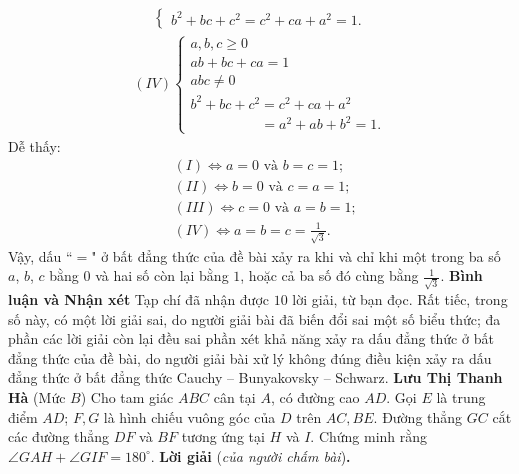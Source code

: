 \begin{multicols}{2}
\begin{align*}
\begin{cases}
			{b^2} + bc + {c^2} = {c^2} + ca + {a^2} = 1.
		\end{cases}
	\end{align*}
	\begin{align*}
		(IV)\begin{cases}
				a,b,c \ge 0\\[-0.5ex]
				ab + bc + ca = 1\\[-0.5ex]
				abc \ne 0\\[-0.5ex]
				{b^2} + bc + {c^2} = {c^2} + ca + {a^2} \\[-0.5ex]
				\quad\quad\quad\quad\quad= {a^2} + ab + {b^2} = 1.
		\end{cases}
	\end{align*}
	Dễ thấy:
	\begin{align*}
		&(I) \Leftrightarrow a = 0 \text{ và } b = c = 1;\\[-0.5ex]
		&(II) \Leftrightarrow b = 0 \text{ và } c = a = 1;\\[-0.5ex]
		&(III) \Leftrightarrow c = 0 \text{ và } a = b = 1;\\[-0.5ex]
		&(IV) \Leftrightarrow a=b=c= \frac{1}{\sqrt{3}}.
	\end{align*}
	Vậy, dấu ``$=$" ở bất đẳng thức của đề bài xảy ra khi và chỉ khi một trong ba số $a$, $b$, $c$ bằng $0$ và hai số còn lại bằng $1$, hoặc cả ba số đó cùng bằng  $\frac{1}{\sqrt{3}}$.
	\vskip 0.05cm
	\textbf{\color{thachthuctoanhoc}Bình luận và Nhận xét}
	\vskip 0.05cm
	Tạp chí đã nhận được $10$ lời giải, từ bạn đọc. Rất tiếc, trong số này, có một lời giải sai, do người giải bài đã biến đổi sai một số biểu thức; đa phần các lời giải còn lại đều sai phần xét khả năng xảy ra dấu đẳng thức ở bất đẳng thức của đề bài, do người giải bài xử lý không đúng điều kiện xảy ra dấu đẳng thức ở bất đẳng thức Cauchy -- Bunyakovsky -- Schwarz.
	\vskip 0.05cm
	\hfill	\textbf{\color{thachthuctoanhoc}Lưu Thị Thanh Hà}
	\vskip 0.01cm
	{}
	(Mức $B$) Cho tam giác $ABC$ cân tại $A$, có đường cao $AD$. Gọi $E$ là trung điểm $AD$; $F,G$ là hình chiếu vuông góc của $D$ trên $AC,BE$. Đường thẳng $GC$ cắt các đường thẳng $DF$ và $BF$ tương ứng tại $H$ và $I$. Chứng minh rằng $\angle{GAH}+\angle{GIF}=180^\circ$.  
	\vskip 0.05cm
	\textbf{\color{thachthuctoanhoc}Lời giải} (\textit{của người chấm bài})\textbf{\color{thachthuctoanhoc}.}
	\begin{figure}[H]
		\vspace*{-10pt}
		\centering
		\captionsetup{labelformat= empty, justification=centering}

\end{figure}
\end{multicols}
